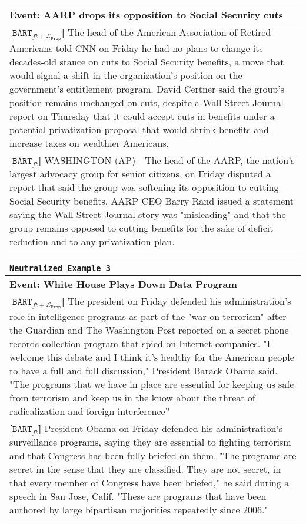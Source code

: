 \documentclass[11pt,a4paper]{article}
\newcommand{\finetune}{$\texttt{BART}_{ft}$}
\newcommand{\prop}{$\texttt{BART}_{ft+\mathcal{L}_\texttt{Prop}}$}
\begin{document}
\begin{table*}[t]
\begin{tabular}{p{15cm}}
        \textbf{Event: AARP drops its opposition to Social Security cuts}\\\midrule
        \textbf{[\prop]} The head of the American Association of Retired Americans told CNN on Friday he had no plans to change its decades-old stance on cuts to Social Security benefits, a move that would signal a shift in the organization's position on the government's entitlement program. David Certner said the group's position remains unchanged on cuts, despite a Wall Street Journal report on Thursday that it could accept cuts in benefits under a potential privatization proposal that would shrink benefits and increase taxes on wealthier Americans.\\\midrule
        \textbf{[\finetune]} WASHINGTON (AP) - The head of the AARP, the nation's largest advocacy group for senior citizens, on Friday disputed a report that said the group was softening its opposition to cutting Social Security benefits. AARP CEO Barry Rand issued a statement saying the Wall Street Journal story was "misleading" and that the group remains opposed to cutting benefits for the sake of deficit reduction and to any privatization plan.\\\bottomrule
    \end{tabular}
    \begin{tabular}{p{15cm}}
    \\
    \toprule
            \texttt{Neutralized Example 3}\\\midrule
        \textbf{Event: White House Plays Down Data Program}\\\midrule
        \textbf{[\prop]} The president on Friday defended his administration's role in intelligence programs as part of the "war on terrorism" after the Guardian and The Washington Post reported on a secret phone records collection program that spied on Internet companies. "I welcome this debate and I think it's healthy for the American people to have a full and full discussion," President Barack Obama said. "The programs that we have in place are essential for keeping us safe from terrorism and keep us in the know about the threat of radicalization and foreign interference”\\\midrule
        \textbf{[\finetune]} President Obama on Friday defended his administration's surveillance programs, saying they are essential to fighting terrorism and that Congress has been fully briefed on them. "The programs are secret in the sense that they are classified. They are not secret, in that every member of Congress have been briefed," he said during a speech in San Jose, Calif. "These are programs that have been authored by large bipartisan majorities repeatedly since 2006."\\\bottomrule
    \end{tabular}
    
    
\end{table*}
\end{document}
